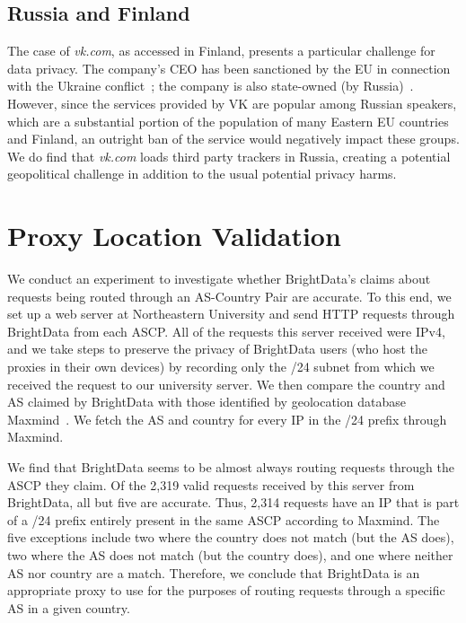 \subsection{Russia and Finland}
The case of \textit{vk.com}, as accessed in Finland, presents a particular challenge
for data privacy. The company's CEO has been sanctioned by the EU in connection 
with the Ukraine conflict~\cite{vksanction}; the company 
is also state-owned (by Russia)~\cite{russiavk}. However,
since the services provided by VK are popular among Russian speakers,
which are a substantial portion of the population of many Eastern EU countries
and Finland, an outright ban of the service would negatively impact
these groups. We do find that \textit{vk.com} loads third party trackers in Russia,
creating a potential geopolitical challenge in addition to the usual potential privacy harms.



\section{Proxy Location Validation}
\label{sec:proxyval}
We conduct an experiment to investigate whether
BrightData's claims about requests being routed through 
an AS-Country Pair are accurate. To this
end, we set up a web server at Northeastern University and
send HTTP requests through BrightData from each 
ASCP. All of the requests this server received were IPv4,
and we take steps to preserve the privacy of BrightData users
(who host the proxies in their own devices) by recording only the 
/24 subnet from which we received the request to our university server. 
We then compare the country and AS claimed by 
BrightData with those identified by geolocation database 
Maxmind~\cite{maxmindgeoloc}.
We fetch the AS and country for every IP in the /24 prefix through Maxmind.

We find that BrightData seems to be almost always routing
requests through the ASCP they claim.
Of the 2,319 valid requests received by this server from BrightData,
all but five are accurate. Thus, 2,314 requests have an IP that is 
part of a /24 prefix entirely present in the same ASCP according
to Maxmind.
The five exceptions include two where the country does not match (but the AS does), two where the AS does not match
(but the country does), and one where neither AS nor country are a match.
Therefore, we conclude that BrightData is an appropriate proxy to use for the 
purposes of routing requests through a specific AS in a given country.

